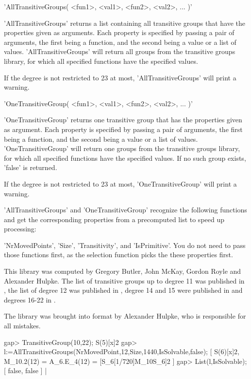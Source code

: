 \>'AllTransitiveGroups( <fun1>, <val1>, <fun2>, <val2>, ... )'

'AllTransitiveGroups' returns   a list containing   all transitive groups
that have the properties given as arguments.   Each property is specified
by  passing a pair   of arguments, the   first being a function, and  the
second being a   value or a  list of  values.  'AllTransitiveGroups' will
return  all groups  from the  transitive  groups  library, for which  all
specified functions have the specified values.

If the degree is not restricted to 23 at most, 'AllTransitiveGroups' will
print a warning.

\>'OneTransitiveGroup( <fun1>, <val1>, <fun2>, <val2>, ... )'

'OneTransitiveGroup' returns one transitive group that has the properties
given  as  argument.  Each  property  is specified by   passing a pair of
arguments, the first being a function, and the second  being a value or a
list of values.   'OneTransitiveGroup'  will return one groups   from the
transitive  groups library, for which  all  specified functions have  the
specified values.  If no such group exists, 'false' is returned.

If the degree is not restricted  to 23 at most, 'OneTransitiveGroup' will
print a warning.

'AllTransitiveGroups'  and 'OneTransitiveGroup'   recognize the following
functions and get the corresponding properties from a precomputed list to
speed up  processing:

'NrMovedPoints', 'Size', 'Transitivity', and
'IsPrimitive'.  You do not  need to pass   those functions first,  as the
selection function picks the these properties first.

This library was computed by Gregory Butler, John McKay, Gordon Royle and
Alexander Hulpke. The  list    of transitive groups   up   to degree  11
was  published in \cite{ButlerMcKay83}, the list of degree  12 was published
in \cite{Royle87}, degree 14 and 15 were published in \cite{Butler93} and
degrees 16-22 in \cite{Hulpke96}.

The library was  brought into {\GAP} format by  Alexander  Hulpke, who is
responsible for all mistakes.

\beginexample
gap> TransitiveGroup(10,22);
S(5)[x]2
gap> l:=AllTransitiveGroups(NrMovedPoint,12,Size,1440,IsSolvable,false);
[ S(6)[x]2, M_10.2(12) = A_6.E_4(12) = [S_6[1/720]{M_10}S_6]2 ]
gap> List(l,IsSolvable);
[ false, false ] |
\endexample

